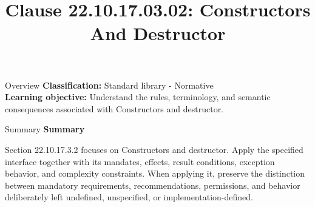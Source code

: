 \documentclass[10pt,letterpaper]{article}
\title{Clause 22.10.17.03.02: Constructors And Destructor}
\author{}
\date{}
\begin{document}
\maketitle
\begin{CornellOverviewBox}{Overview}
\textbf{Classification:} Standard library - Normative\\[2pt]
\textbf{Learning objective:} Understand the rules, terminology, and semantic consequences associated with Constructors and destructor.
\end{CornellOverviewBox}\begin{CornellSummaryBox}{Summary}
{\sffamily\bfseries\color{Accent} Summary}\par\vspace{3pt}Section 22.10.17.3.2 focuses on Constructors and destructor. Apply the specified interface together with its mandates, effects, result conditions, exception behavior, and complexity constraints. When applying it, preserve the distinction between mandatory requirements, recommendations, permissions, and behavior deliberately left undefined, unspecified, or implementation-defined.
\end{CornellSummaryBox}
\end{document}
